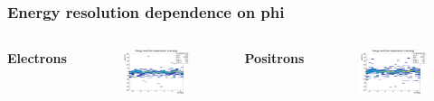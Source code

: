 \documentclass{beamer}
\begin{document}
		\begin{frame}
			\frametitle{Energy resolution dependence on phi}
			\begin{columns}
				\centering
				\Large \textbf{Electrons}
				\begin{figure}
					\centering
					\includegraphics[width = 0.95 \linewidth]{images/c_e_deltaenergy_phi.png}
				\end{figure}
				\centering
				\Large \textbf{Positrons}
				\begin{figure}
					\centering
					\includegraphics[width = 0.95 \linewidth]{images/c_p_deltaenergy_phi.png}
				\end{figure}
			\end{columns}
		\end{frame}
\end{document}

